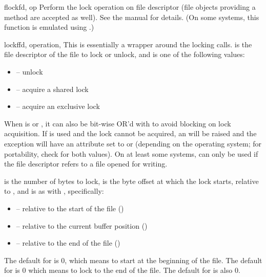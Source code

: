 \begin{funcdesc}{flock}{fd, op}
Perform the lock operation  on file descriptor  (file
  objects providing a  method are accepted as well).
See the \UNIX{} manual  for details.  (On some
systems, this function is emulated using .)
\end{funcdesc}

\begin{funcdesc}{lockf}{fd, operation,
    }
This is essentially a wrapper around the  locking
calls.   is the file descriptor of the file to lock or unlock,
and  is one of the following values:

\begin{itemize}
\item {} -- unlock
\item {} -- acquire a shared lock
\item {} -- acquire an exclusive lock
\end{itemize}

When  is  or , it
can also be bit-wise OR'd with  to avoid blocking on
lock acquisition.  If  is used and the lock cannot
be acquired, an  will be raised and the exception
will have an  attribute set to  or
 (depending on the operating system; for portability,
check for both values).  On at least some systems, 
can only be used if the file descriptor refers to a file opened for
writing.

 is the number of bytes to lock,  is the byte
offset at which the lock starts, relative to , and
 is as with , specifically:

\begin{itemize}
\item {} -- relative to the start of the file
      ()
\item {} -- relative to the current buffer position
      ()
\item {} -- relative to the end of the file
      ()
\end{itemize}

The default for  is 0, which means to start at the
beginning of the file.  The default for  is 0 which means
to lock to the end of the file.  The default for  is also
0.
\end{funcdesc}

